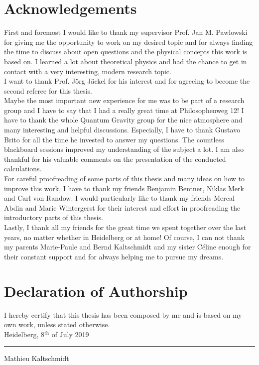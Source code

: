 \thispagestyle{plain}
\section*{Acknowledgements}
First and foremost I would like to thank my supervisor Prof. Jan M. Pawlowski for giving me the opportunity to work on my desired topic and for always finding the time to discuss about open questions and the physical concepts this work is based on. I learned a lot about theoretical physics and had the chance to get in contact with a very interesting, modern research topic.\\
I want to thank Prof. J\"org J\"ackel for his interest and for agreeing to become the second referee for this thesis.\\
Maybe the most important new experience for me was to be part of a research group and I have to say that I had a really great time at Philosophenweg 12! I have to thank the whole Quantum Gravity group for the nice atmosphere and many interesting and helpful discussions. Especially, I have to thank Gustavo Brito for all the time he invested  to answer my questions. The countless blackboard sessions improved my understanding of the subject a lot. I am also thankful for his valuable comments on the presentation of the conducted calculations.\\
For careful proofreading of some parts of this thesis and many ideas on how to improve this work, I have to thank my friends Benjamin Bentner, Niklas Merk and Carl von Randow. I would particularly like to thank my friends Mercal Abdin and Marie Wintergerst for their interest and effort in proofreading the introductory parts of this thesis. \\
Lastly, I thank all my friends for the great time we spent together over the last years, no matter whether in Heidelberg or at home! Of course, I can not thank my parents Marie-Paule and Bernd Kaltschmidt and my sister C\'{e}line enough for their constant support and for always helping me to pursue my dreams.  
 
\vfill
\section*{Declaration of Authorship}
I hereby certify that this thesis has been composed by me and is based on my own work, unless stated otherwise.\\

Heidelberg, 8$^{\mathrm{th}}$ of July 2019 \hfill \rule{60mm}{.15mm} \par \vspace{-0.4cm}
\hfill Mathieu Kaltschmidt
\vfill

